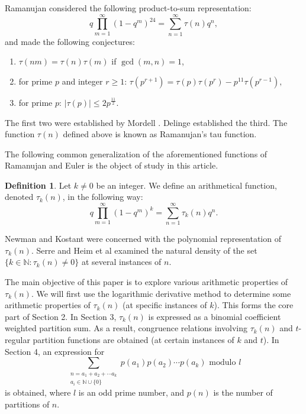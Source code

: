 \documentclass[10pt]{article}
\theoremstyle{definition}
\newtheorem{definition}[theorem]{Definition}
\begin{document}
Ramanujan \cite{ramanujan} considered the following product-to-sum representation:
\begin{equation*}
q\prod_{m=1}^{\infty}{(1-q^m)^{24}}=\sum_{n=1}^{\infty}\tau(n)q^n,
\end{equation*}
and made the following conjectures:
\begin{enumerate}
\item $\tau(nm)=\tau(n)\tau(m)$ if $\gcd(m,n)=1$,
\item for prime $p$ and integer $r\geq 1$:
$\tau(p^{r+1})=\tau(p)\tau(p^r)-p^{11}\tau(p^{r-1}),
$
\item for prime $p$:
$|\tau(p)|\leq 2p^{\frac{11}{2}}.
$
\end{enumerate}
The first two were established by Mordell \cite{mordell-1}. Delinge \cite{delinge} established the third. The function $\tau(n)$ defined above is known as Ramanujan's tau function.

The following common generalization of the aforementioned functions of Ramanujan and Euler is the object of study in this article.
\begin{definition}\label{main-definition}
Let $k\neq 0$ be an integer. We define an arithmetical function, denoted $\tau_k(n)$, in the following way:
\begin{equation}
q\prod_{m=1}^{\infty}(1-q^m)^k=\sum_{n=1}^{\infty}\tau_k(n)q^n.
\end{equation}
\end{definition}
Newman \cite{newman} and Kostant \cite{kostant} were concerned with the polynomial representation of $\tau_k(n)$. Serre \cite{serre} and Heim et al \cite{Bernard} examined  the natural density of the set $\{k\in\mathbb{N}: \tau_k(n)\neq 0\}$ at several instances of $n$.

The main objective of this paper is to explore various arithmetic properties of $\tau_k(n)$. We will first use the logarithmic derivative method to determine some arithmetic properties of $\tau_k(n)$ (at specific instances of $k$). This forms the core part of Section 2. In Section 3, $\tau_k(n)$ is expressed as a binomial coefficient weighted partition sum. As a result, congruence relations involving $\tau_k(n)$ and $t$-regular partition functions are obtained (at certain instances of $k$ and $t$). In Section 4, an expression for 
$$
\sum_{\substack{{n=a_1+a_2+\cdots a_k}\\{a_{i}\in\mathbb{N}\cup\{0\}}}}p(a_{1})p(a_{2})\cdots p(a_{k})\text{ modulo }{l}
$$
is obtained, where $l$ is an odd prime number, and $p(n)$ is the number of partitions of $n$.
\end{document}
